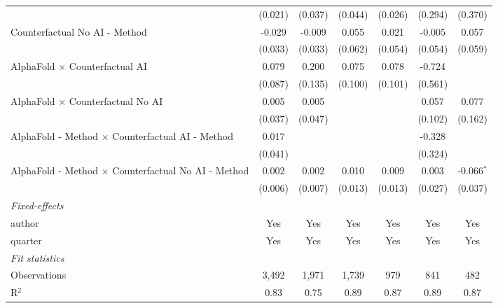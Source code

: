 \begin{tabular}{lcccccc}
                                                              & (0.021) & (0.037) & (0.044)      & (0.026) & (0.294) & (0.370)\\   
   Counterfactual No AI - Method                              & -0.029  & -0.009  & 0.055        & 0.021   & -0.005  & 0.057\\   
                                                              & (0.033) & (0.033) & (0.062)      & (0.054) & (0.054) & (0.059)\\   
   AlphaFold $\times$ Counterfactual AI                       & 0.079   & 0.200   & 0.075        & 0.078   & -0.724  &   \\   
                                                              & (0.087) & (0.135) & (0.100)      & (0.101) & (0.561) &   \\   
   AlphaFold $\times$ Counterfactual No AI                    & 0.005   & 0.005   &              &         & 0.057   & 0.077\\   
                                                              & (0.037) & (0.047) &              &         & (0.102) & (0.162)\\   
   AlphaFold - Method $\times$ Counterfactual AI - Method     & 0.017   &         &              &         & -0.328  &   \\   
                                                              & (0.041) &         &              &         & (0.324) &   \\   
   AlphaFold - Method $\times$ Counterfactual No AI - Method  & 0.002   & 0.002   & 0.010        & 0.009   & 0.003   & -0.066$^{*}$\\   
                                                              & (0.006) & (0.007) & (0.013)      & (0.013) & (0.027) & (0.037)\\   
   \midrule
   \emph{Fixed-effects}\\
   author                                                     & Yes     & Yes     & Yes          & Yes     & Yes     & Yes\\  
   quarter                                                    & Yes     & Yes     & Yes          & Yes     & Yes     & Yes\\  
   \midrule
   \emph{Fit statistics}\\
   Observations                                               & 3,492   & 1,971   & 1,739        & 979     & 841     & 482\\  
   R$^2$                                                      & 0.83    & 0.75    & 0.89         & 0.87    & 0.89    & 0.87\\  

\end{tabular}
